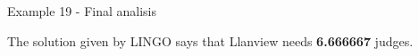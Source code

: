 \begin{frame}{Example 19 - Final analisis}

The solution given by LINGO says that Llanview needs \textbf{6.666667} judges.

\end{frame}
